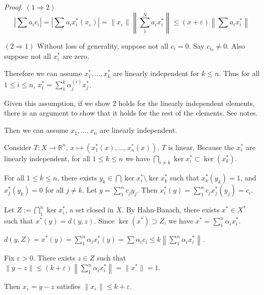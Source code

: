 \documentclass[11pt, reqno]{article}
\theoremstyle{plain}
\theoremstyle{definition}
\theoremstyle{remark}
\renewcommand{\epsilon}{\varepsilon}
\newcommand{\RR}{\mathbb{R}}
\begin{document}
\textit{Proof.} $(1 \Rightarrow 2)$
\[
    \left|\sum a_i c_i\right| = \left| \sum a_i x_i^*(x_\epsilon)\right| = \|x_\epsilon\|\left\|\sum_1^N a_i x_i^*\right\|
    \leq (x + \epsilon)\left\|\sum a_i x_i^*\right\|
\]

$(2 \Rightarrow 1)$ Without loss of generality, suppose not all $c_i = 0$. Say $c_{i_0} \neq 0$. Also suppose 
not all $x_i^*$ are zero. 

Therefore we can assume $x_1^*, \dots, x_k^*$ are linearly independent for $k \leq n$. Thus for all $1 \leq i \leq n$,
$x_i^* = \sum_1^k \alpha_j^{(i)} x_j^*$.

Given this assumption, if we show $2$ holds for the linearly independent elements, there is an argument to show
that it holds for the rest of the elements. See notes.

Then we can assume $x_1, \dots, x_n$ are linearly independent. 

Consider $T: X \rightarrow \RR^n$, $x \mapsto (x_1^*(x), \dots, x_n^*(x))$. $T$ is linear. Because the $x_i^*$ are linearly
independent, for all $1 \leq k \leq n$ we have $\bigcap_{i \neq k} \ker x_i^* \subset \ker(x_k^*)$. 

For all $1 \leq k \leq n$, there exists $y_k \in \bigcap \ker x_i^* \setminus \ker x_k^*$ such that $x_k^*(y_k) = 1$,
and $x_j^*(y_k) = 0$ for all $j \neq k$. Let $y = \sum_1^n c_j y_j$. Then $x_i^*(y) = \sum_1^n c_j x_j^*(y_j) = c_i$.

Let $Z := \bigcap_1^n \ker x_i^*$, a set closed in $X$. By Hahn-Banach, there exists $x^* \in X^*$ such that 
$x^*(y) = d(y,z)$. Since $\ker(x^*) \supset Z$, we have $x^* = \sum_1^n \alpha_i x_i^*$. 

$d(y,Z) = x^*(y) = \sum_1^n \alpha_i x_i^*(y) = \sum \alpha_i c_i \leq k\left\|\sum_1^n \alpha_i x_i^*\right\|$.

Fix $\epsilon > 0$. There exists $z \in Z$ such that $\|y - z\| \leq (k + \epsilon)\left\|\sum_1^n \alpha_i x_i^*\right\| = \|x^*\| = 1$.

Then $x_\epsilon = y - z$ satisfies $\|x_\epsilon\| \leq k + \epsilon$.
\end{document}

